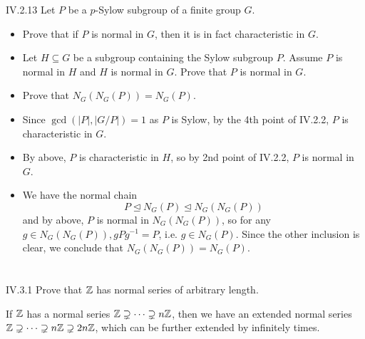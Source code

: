 \begin{problem}{IV.2.13}
Let $P$ be a $p$-Sylow subgroup of a finite group $G$.
\begin{itemize}
    \setlength\itemsep{0pt}
    \item Prove that if $P$ is normal in $G$, then it is in fact characteristic in $G$.
    \item Let $H \subseteq G$ be a subgroup containing the Sylow subgroup $P$. Assume $P$ is normal in $H$ and $H$ is normal in $G$. Prove that $P$ is normal in $G$.
    \item Prove that $N_G(N_G(P)) = N_G(P)$.
\end{itemize}
\end{problem}
\begin{pf}
\begin{itemize}
    \setlength\itemsep{0pt}
    \item Since $\gcd(|P|, |G/P|) = 1$ as $P$ is Sylow, by the 4th point of IV.2.2, $P$ is characteristic in $G$.
    \item By above, $P$ is characteristic in $H$, so by 2nd point of IV.2.2, $P$ is normal in $G$.
    \item We have the normal chain
    \[
    P \trianglelefteq N_G(P) \trianglelefteq N_G(N_G(P))	
    \]
    and by above, $P$ is normal in $N_G(N_G(P))$, so for any $g \in N_G(N_G(P)), gPg^{-1} = P$, i.e. $g \in N_G(P)$. Since the other inclusion is clear, we conclude that $N_G(N_G(P)) = N_G(P)$. 
\end{itemize}
\end{pf}

\section{}

\begin{problem}{IV.3.1}
Prove that $\mathbb{Z}$ has normal series of arbitrary length.
\end{problem}
\begin{pf}
If $\mathbb{Z}$ has a normal series $\mathbb{Z} \supsetneq \cdots \supsetneq n\mathbb{Z}$, then we have an extended normal series $\mathbb{Z} \supsetneq \cdots \supsetneq n\mathbb{Z} \supsetneq 2n\mathbb{Z}$, which can be further extended by infinitely times.
\end{pf}

